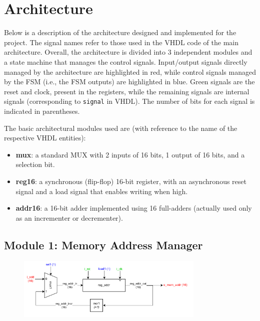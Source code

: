 \documentclass{article}
\begin{document}
\section{Architecture}
Below is a description of the architecture designed and implemented for the project. The signal names refer to those used in the VHDL code of the main architecture. Overall, the architecture is divided into 3 independent modules and a state machine that manages the control signals. Input/output signals directly managed by the architecture are highlighted in red, while control signals managed by the FSM (i.e., the FSM outputs) are highlighted in blue. Green signals are the reset and clock, present in the registers, while the remaining signals are internal signals (corresponding to \texttt{signal} in VHDL). The number of bits for each signal is indicated in parentheses.

The basic architectural modules used are (with reference to the name of the respective VHDL entities):
\begin{itemize}
    \item \textbf{mux}: a standard MUX with 2 inputs of 16 bits, 1 output of 16 bits, and a selection bit.
    \item \textbf{reg16}: a synchronous (flip-flop) 16-bit register, with an asynchronous reset signal and a load signal that enables writing when high.
    \item \textbf{addr16}: a 16-bit adder implemented using 16 full-adders (actually used only as an incrementer or decrementer).
\end{itemize}

\subsection{Module 1: Memory Address Manager}

\begin{figure}[htbp]
  \centering
  \includegraphics[width=0.8\textwidth]{modulo1.pdf}
  \label{fig:Module 1: Memory Address Manager}
\end{figure}
\end{document}
